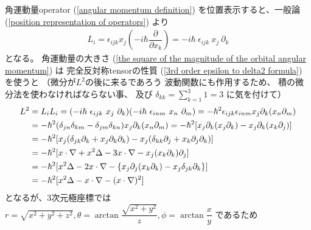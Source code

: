 角運動量operator
(\ref{angular momentum definition})
を位置表示すると、一般論
(\ref{position representation of operators})
より
\begin{align}
    L_i
=
    \epsilon_{ijk}
    x_j \left(
        - i \hbar \dfrac{\partial}{\partial x_k}
    \right)
=
    - i \hbar\ 
    \epsilon_{ijk}\ 
    x_j\ \partial_k
\end{align}
となる。
角運動量の大きさ
(\ref{the square of the magnitude of the orbital angular momentum})
は
完全反対称tensorの性質
(\ref{3rd order epsilon to delta2 formula})
を使うと
（微分が$L^2$の後に来るであろう
波動関数にも作用するため、
積の微分法を使わなければならない事、
及び
$\displaystyle
\delta_{kk} = \sum_{k = 1}^3 1
= 3$
に気を付けて）
\begin{align}
    L^2
    &= L_i L_i
=
    (- i \hbar\ 
    \epsilon_{ijk}\ 
    x_j\ \partial_k)
    (- i \hbar\ 
    \epsilon_{inm}\ 
    x_n\ \partial_m)
=
    - \hbar^2
    \epsilon_{ijk}
    \epsilon_{inm}
    x_j \partial_k
    (x_n \partial_m)
\notag\\&
=
    - \hbar^2
    (\delta_{jn} \delta_{km}
    - \delta_{jm} \delta_{kn})
    x_j \partial_k
    (x_n \partial_m)
=
    - \hbar^2
    [
        x_j \partial_k
        (x_j \partial_k)
    -
        x_j \partial_k
        (x_k \partial_j)
    ]
\notag\\&
=
    - \hbar^2
    [
        x_j
        (
            \delta_{jk} \partial_k
        +
            x_j \partial_k \partial_k
        )
    -
        x_j
        (
            \delta_{kk} \partial_j
        +
            x_k \partial_j \partial_k
        )
    ]
\notag\\&
=
    - \hbar^2
    [
        \bm{x} \cdot \nabla
    +
        \bm{x}^2
        \Delta
    -
        3 \bm{x} \cdot \nabla
    -
        x_j (x_k \partial_k) \partial_j
    ]
\notag\\&
=
    - \hbar^2
    [
        \bm{x}^2
        \Delta
    -
        2 \bm{x} \cdot \nabla
    -
        \{
            x_j \partial_j
            (x_k \partial_k)
        -
            x_j \delta_{jk} \partial_k
        \}
    ]
\notag\\&
=
    - \hbar^2
    [
        \bm{x}^2
        \Delta
    -
        \bm{x} \cdot \nabla
    -
        (\bm{x} \cdot \nabla)^2
    ]
\end{align}
となるが、$3$次元極座標では
$r = \sqrt{x^2 + y^2 + z^2},
\theta = \arctan
\dfrac{\sqrt{x^2 + y^2}}{z},
\phi = \arctan \dfrac{x}{y}
$
であるため
